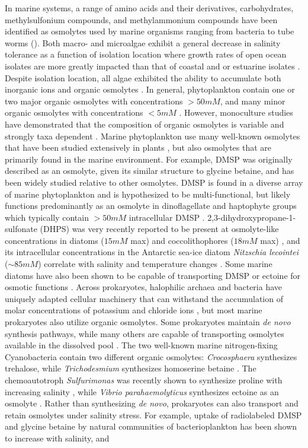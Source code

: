 \documentclass[utf8]{frontiersSCNS} %
\begin{document}
In marine systems, a range of amino acids and their derivatives, carbohydrates, methylsulfonium compounds, and methylammonium compounds have been identified as osmolytes used by marine organisms ranging from bacteria to tube worms \citep{Yancey2005} (). Both macro- and microalgae exhibit a general decrease in salinity tolerance as a function of isolation location where growth rates of open ocean isolates are more greatly impacted than that of coastal and or estuarine isolates \citep{Brand1984,Kirst1989}. Despite isolation location, all algae exhibited the ability to accumulate both inorganic ions and organic osmolytes \citep{Bisson1995}. In general, phytoplankton contain one or two major organic osmolytes with concentrations $> 50mM$, and many minor organic osmolytes with concentrations $< 5mM$ \citep{Gebser2013}. However, monoculture studies have demonstrated that the composition of organic osmolytes is variable and strongly taxa dependent \citep{Dickson1987,Dickson1987.2}. Marine phytoplankton use many well-known osmolytes that have been studied extensively in plants \citep{Yancey2005}, but also osmolytes that are primarily found in the marine environment. For example, DMSP was originally described as an osmolyte, given its similar structure to glycine betaine, and has been widely studied relative to other osmolytes. DMSP is found in a diverse array of marine phytoplankton and is hypothesized to be multi-functional, but likely functions predominantly as an osmolyte in dinoflagellate and haptophyte groups which typically contain $>50mM$ intracellular DMSP \citep{Keller1989,Stefels2000,McParland2020}. 2,3-dihydroxypropane-1-sulfonate (DHPS) was very recently reported to be present at osmolyte-like concentrations in diatoms ($15mM$ max) and coccolithophores ($18mM$ max) \citep{Durham2019}, and its intracellular concentrations in the Antarctic sea-ice diatom \emph{Nitzschia lecointei} ($\sim 85mM$) correlate with salinity and temperature changes \citep{Dawson2020}. Some marine diatoms have also been shown to be capable of transporting DMSP or ectoine for osmotic functions \citep{Spielmeyer2011,Lavoie2018,Fenizia2020}. Across prokaryotes, halophilic archaea and bacteria have uniquely adapted cellular machinery that can withstand the accumulation of molar concentrations of potassium and chloride ions \citep{Roebler2001}, but most marine prokaryotes also utilize organic osmolytes. Some prokaryotes maintain \emph{de novo} synthesis pathways, while many others are capable of transporting osmolytes available in the dissolved pool \citep{Poli2017,Poretsky2010}.  The two well-known marine nitrogen-fixing Cyanobacteria contain two different organic osmolytes: \emph{Crocosphaera} synthesizes trehalose, while \emph{Trichodesmium} synthesizes homoserine betaine \citep{Pade2012,Pade2016}. The chemoautotroph \emph{Sulfurimonas} was recently shown to synthesize proline with increasing salinity \citep{Gotz2018}, while \emph{Vibrio parahaemolyticus} synthesizes ectoine as an osmolyte \citep{Ongagna-Yhombi2013}. Rather than synthesizing \emph{de novo}, prokaryotes can also transport and retain osmolytes under salinity stress. For example,  uptake of radiolabeled DMSP and glycine betaine by natural communities of bacterioplankton has been shown to increase with salinity, and 
\end{document}
